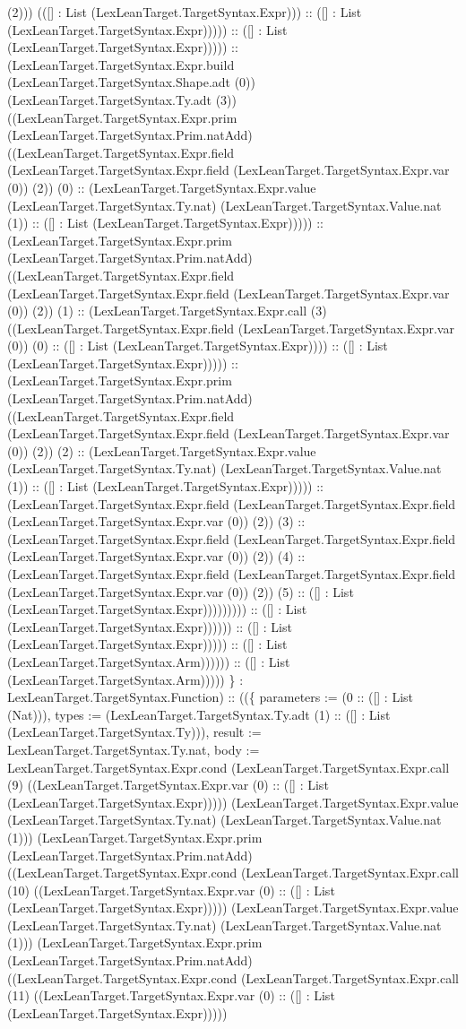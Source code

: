 \documentclass[11pt]{article}
\begin{document}
(2))) (([] : List (LexLeanTarget.TargetSyntax.Expr))) :: ([] : List (LexLeanTarget.TargetSyntax.Expr))))) :: ([] : List (LexLeanTarget.TargetSyntax.Expr))))) :: (LexLeanTarget.TargetSyntax.Expr.build (LexLeanTarget.TargetSyntax.Shape.adt (0)) (LexLeanTarget.TargetSyntax.Ty.adt (3)) ((LexLeanTarget.TargetSyntax.Expr.prim (LexLeanTarget.TargetSyntax.Prim.natAdd) ((LexLeanTarget.TargetSyntax.Expr.field (LexLeanTarget.TargetSyntax.Expr.field (LexLeanTarget.TargetSyntax.Expr.var (0)) (2)) (0) :: (LexLeanTarget.TargetSyntax.Expr.value (LexLeanTarget.TargetSyntax.Ty.nat) (LexLeanTarget.TargetSyntax.Value.nat (1)) :: ([] : List (LexLeanTarget.TargetSyntax.Expr))))) :: (LexLeanTarget.TargetSyntax.Expr.prim (LexLeanTarget.TargetSyntax.Prim.natAdd) ((LexLeanTarget.TargetSyntax.Expr.field (LexLeanTarget.TargetSyntax.Expr.field (LexLeanTarget.TargetSyntax.Expr.var (0)) (2)) (1) :: (LexLeanTarget.TargetSyntax.Expr.call (3) ((LexLeanTarget.TargetSyntax.Expr.field (LexLeanTarget.TargetSyntax.Expr.var (0)) (0) :: ([] : List (LexLeanTarget.TargetSyntax.Expr)))) :: ([] : List (LexLeanTarget.TargetSyntax.Expr))))) :: (LexLeanTarget.TargetSyntax.Expr.prim (LexLeanTarget.TargetSyntax.Prim.natAdd) ((LexLeanTarget.TargetSyntax.Expr.field (LexLeanTarget.TargetSyntax.Expr.field (LexLeanTarget.TargetSyntax.Expr.var (0)) (2)) (2) :: (LexLeanTarget.TargetSyntax.Expr.value (LexLeanTarget.TargetSyntax.Ty.nat) (LexLeanTarget.TargetSyntax.Value.nat (1)) :: ([] : List (LexLeanTarget.TargetSyntax.Expr))))) :: (LexLeanTarget.TargetSyntax.Expr.field (LexLeanTarget.TargetSyntax.Expr.field (LexLeanTarget.TargetSyntax.Expr.var (0)) (2)) (3) :: (LexLeanTarget.TargetSyntax.Expr.field (LexLeanTarget.TargetSyntax.Expr.field (LexLeanTarget.TargetSyntax.Expr.var (0)) (2)) (4) :: (LexLeanTarget.TargetSyntax.Expr.field (LexLeanTarget.TargetSyntax.Expr.field (LexLeanTarget.TargetSyntax.Expr.var (0)) (2)) (5) :: ([] : List (LexLeanTarget.TargetSyntax.Expr))))))))) :: ([] : List (LexLeanTarget.TargetSyntax.Expr)))))) :: ([] : List (LexLeanTarget.TargetSyntax.Expr))))) :: ([] : List (LexLeanTarget.TargetSyntax.Arm)))))) :: ([] : List (LexLeanTarget.TargetSyntax.Arm))))) \} : LexLeanTarget.TargetSyntax.Function) :: ((\{ parameters := (0 :: ([] : List (Nat))), types := (LexLeanTarget.TargetSyntax.Ty.adt (1) :: ([] : List (LexLeanTarget.TargetSyntax.Ty))), result := LexLeanTarget.TargetSyntax.Ty.nat, body := LexLeanTarget.TargetSyntax.Expr.cond (LexLeanTarget.TargetSyntax.Expr.call (9) ((LexLeanTarget.TargetSyntax.Expr.var (0) :: ([] : List (LexLeanTarget.TargetSyntax.Expr))))) (LexLeanTarget.TargetSyntax.Expr.value (LexLeanTarget.TargetSyntax.Ty.nat) (LexLeanTarget.TargetSyntax.Value.nat (1))) (LexLeanTarget.TargetSyntax.Expr.prim (LexLeanTarget.TargetSyntax.Prim.natAdd) ((LexLeanTarget.TargetSyntax.Expr.cond (LexLeanTarget.TargetSyntax.Expr.call (10) ((LexLeanTarget.TargetSyntax.Expr.var (0) :: ([] : List (LexLeanTarget.TargetSyntax.Expr))))) (LexLeanTarget.TargetSyntax.Expr.value (LexLeanTarget.TargetSyntax.Ty.nat) (LexLeanTarget.TargetSyntax.Value.nat (1))) (LexLeanTarget.TargetSyntax.Expr.prim (LexLeanTarget.TargetSyntax.Prim.natAdd) ((LexLeanTarget.TargetSyntax.Expr.cond (LexLeanTarget.TargetSyntax.Expr.call (11) ((LexLeanTarget.TargetSyntax.Expr.var (0) :: ([] : List (LexLeanTarget.TargetSyntax.Expr))))) 
\end{document}
